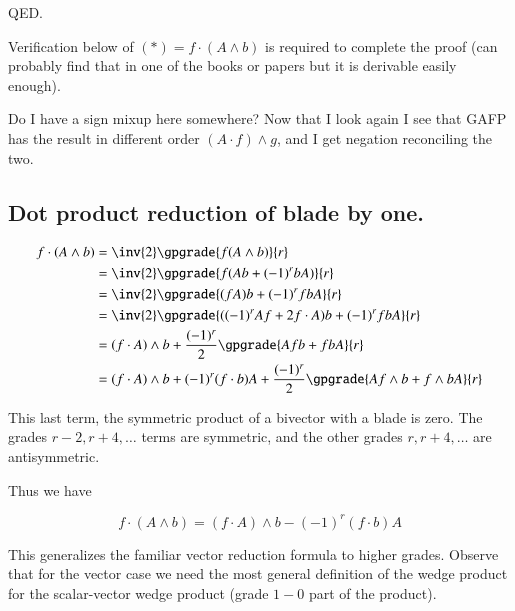 \documentclass{article}
\begin{document}
QED.

Verification below of $(*) = f \cdot (A \wedge b)$ is required to complete the proof (can probably find that in one of the books or papers but it is derivable
easily enough).

Do I have a sign mixup here somewhere?  Now that I look again I see that GAFP
has the result in different order $(A \cdot f) \wedge g$, and I get negation
reconciling the two.

\subsection{Dot product reduction of blade by one. }

\begin{align*}
f \cdot (A \wedge b)
&= \inv{2} \gpgrade{f (A \wedge b)}{r} \\
&= \inv{2} \gpgrade{f (A b + (-1)^r b A)}{r} \\
&= \inv{2} \gpgrade{(f A) b + (-1)^r f b A}{r} \\
&= \inv{2} \gpgrade{((-1)^r A f + 2 f \cdot A) b + (-1)^r f b A}{r} \\
&= (f \cdot A) \wedge b + \frac{(-1)^r}{2} \gpgrade{A f b + f b A}{r} \\
&= (f \cdot A) \wedge b + (-1)^r (f \cdot b) A
+ \frac{(-1)^r}{2} \gpgrade{A f \wedge b + f \wedge b A}{r} \\
\end{align*}

This last term, the symmetric product of a bivector with a blade is zero.
The grades $r-2, r+4, \ldots$ terms are symmetric, and the other grades
$r, r+4, \ldots$ are antisymmetric.

Thus we have

\begin{equation}
f \cdot (A \wedge b)
= (f \cdot A) \wedge b - (-1)^r (f \cdot b) A
\end{equation}

This generalizes the familiar vector reduction formula to higher grades.
Observe that for the vector case we need the most general definition
of the wedge product for the scalar-vector wedge product (grade $1-0$ part of the product).

\end{document}
